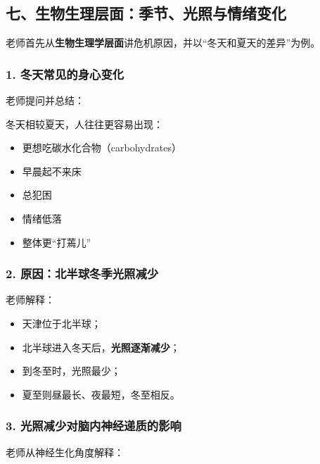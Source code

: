 \documentclass[
  chinese,
  9pt,
  a4paper,
]{ctexart}
\providecommand{\tightlist}{%
  \setlength{\itemsep}{0pt}\setlength{\parskip}{0pt}}
\begin{document}
\subsection{七、生物生理层面：季节、光照与情绪变化}\label{ux4e03ux751fux7269ux751fux7406ux5c42ux9762ux5b63ux8282ux5149ux7167ux4e0eux60c5ux7eeaux53d8ux5316}

老师首先从\textbf{生物生理学层面}讲危机原因，并以``冬天和夏天的差异''为例。

\subsubsection{1.
冬天常见的身心变化}\label{ux51acux5929ux5e38ux89c1ux7684ux8eabux5fc3ux53d8ux5316}

老师提问并总结：

冬天相较夏天，人往往更容易出现：

\begin{itemize}
\tightlist
\item
  更想吃碳水化合物（carbohydrates）
\item
  早晨起不来床
\item
  总犯困
\item
  情绪低落
\item
  整体更``打蔫儿''
\end{itemize}

\subsubsection{2.
原因：北半球冬季光照减少}\label{ux539fux56e0ux5317ux534aux7403ux51acux5b63ux5149ux7167ux51cfux5c11}

老师解释：

\begin{itemize}
\tightlist
\item
  天津位于北半球；
\item
  北半球进入冬天后，\textbf{光照逐渐减少}；
\item
  到冬至时，光照最少；
\item
  夏至则昼最长、夜最短，冬至相反。
\end{itemize}

\subsubsection{3.
光照减少对脑内神经递质的影响}\label{ux5149ux7167ux51cfux5c11ux5bf9ux8111ux5185ux795eux7ecfux9012ux8d28ux7684ux5f71ux54cd}

老师从神经生化角度解释：
\end{document}

